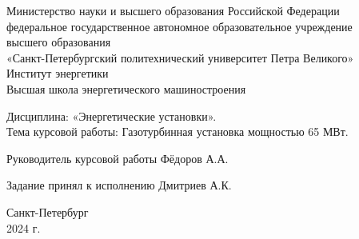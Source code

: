 \begin{titlepage}
  \begin{center}
    Министерство науки и высшего образования Российской Федерации \\
    федеральное государственное автономное образовательное учреждение\\
    высшего образования\\
    «Санкт-Петербургский политехнический университет Петра Великого»\\
    Институт энергетики\\
    Высшая школа энергетического машиностроения
  \end{center}

  \vspace{3cm}

  \begin{center}
    \begin{large}
      Дисциплина: «Энергетические установки».\\
      \vspace{1cm}
      Тема курсовой работы: Газотурбинная установка мощностью 65 МВт.
    \end{large}
  \end{center}

  \vspace{5cm}

  \begin{center}
    Руководитель курсовой работы \hrulefill Фёдоров А.А.

    \vspace{0.5cm}

    Задание принял к исполнению \hrulefill Дмитриев А.К.
  \end{center}

  \vfill
  \begin{center}
    Санкт-Петербург\\
    2024 г.
  \end{center}
\end{titlepage}
